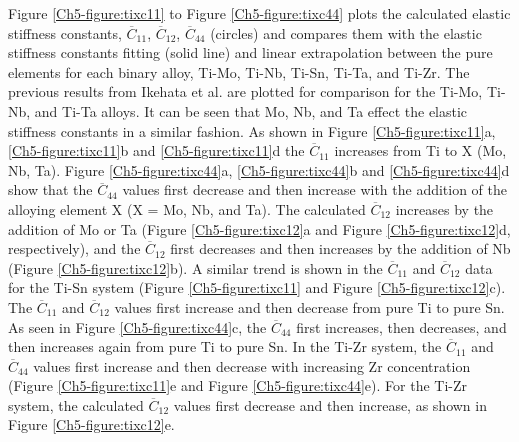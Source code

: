 Figure \ref{Ch5-figure:tixc11} to Figure \ref{Ch5-figure:tixc44} plots the calculated elastic stiffness constants, $\overline{C}_{11}$, $\overline{C}_{12}$, $\overline{C}_{44}$ (circles) and compares them with the elastic stiffness constants fitting (solid line) and linear extrapolation between the pure elements for each binary alloy, Ti-Mo, Ti-Nb, Ti-Sn, Ti-Ta, and Ti-Zr. The previous results from Ikehata et al. \cite{Ikehata2004} are plotted for comparison for the Ti-Mo, Ti-Nb, and Ti-Ta alloys. It can be seen that Mo, Nb, and Ta effect the elastic stiffness constants in a similar fashion. As shown in Figure \ref{Ch5-figure:tixc11}a, \ref{Ch5-figure:tixc11}b and \ref{Ch5-figure:tixc11}d the $\overline{C}_{11}$ increases from Ti to X (Mo, Nb, Ta). Figure \ref{Ch5-figure:tixc44}a, \ref{Ch5-figure:tixc44}b and \ref{Ch5-figure:tixc44}d show that the $\overline{C}_{44}$ values first decrease and then increase with the addition of the alloying element X (X = Mo, Nb, and Ta). The calculated $\overline{C}_{12}$ increases by the addition of Mo or Ta (Figure \ref{Ch5-figure:tixc12}a and Figure \ref{Ch5-figure:tixc12}d, respectively), and the $\overline{C}_{12}$ first decreases and then increases by the addition of Nb (Figure \ref{Ch5-figure:tixc12}b). A similar trend is shown in the $\overline{C}_{11}$ and $\overline{C}_{12}$ data for the Ti-Sn system (Figure \ref{Ch5-figure:tixc11} and Figure \ref{Ch5-figure:tixc12}c). The $\overline{C}_{11}$ and $\overline{C}_{12}$ values first increase and then decrease from pure Ti to pure Sn. As seen in Figure \ref{Ch5-figure:tixc44}c, the $\overline{C}_{44}$ first increases, then decreases, and then increases again from pure Ti to pure Sn. In the Ti-Zr system, the $\overline{C}_{11}$ and $\overline{C}_{44}$ values first increase and then decrease with increasing Zr concentration (Figure \ref{Ch5-figure:tixc11}e and Figure \ref{Ch5-figure:tixc44}e). For the Ti-Zr system, the calculated $\overline{C}_{12}$ values first decrease and then increase, as shown in Figure \ref{Ch5-figure:tixc12}e.

